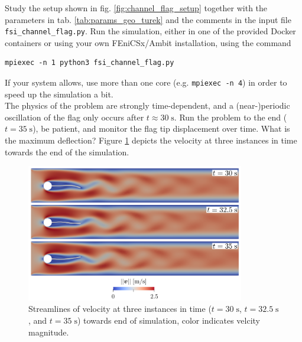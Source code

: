 \documentclass[a4paper,12pt]{report}
\begin{document}
Study the setup shown in fig. \ref{fig:channel_flag_setup} together with the parameters in tab. \ref{tab:params_geo_turek} and the comments in the input file \verb"fsi_channel_flag.py". Run the simulation, either in one of the provided Docker containers or using your own FEniCSx/Ambit installation, using the command
\begin{verbatim}
mpiexec -n 1 python3 fsi_channel_flag.py
\end{verbatim}

If your system allows, use more than one core (e.g. \verb"mpiexec -n 4") in order to speed up the simulation a bit.\\

The physics of the problem are strongly time-dependent, and a (near-)periodic oscillation of the flag only occurs after $t\approx 30\;\mathrm{s}$. Run the problem to the end ($t = 35\;\mathrm{s}$), be patient, and monitor the flag tip displacement over time. What is the maximum deflection? Figure \ref{fig:channel_flag_results} depicts the velocity at three instances in time towards the end of the simulation.

\begin{figure}
\centering
\includegraphics[width=0.85\textwidth]{fig/channel_flag_results.png}
\caption{Streamlines of velocity at three instances in time ($t=30\;\mathrm{s}$, $t=32.5\;\mathrm{s}$, and $t=35\;\mathrm{s}$) towards end of simulation, color indicates velcity magnitude.}
\label{fig:channel_flag_results}
\end{figure}


\end{document}
